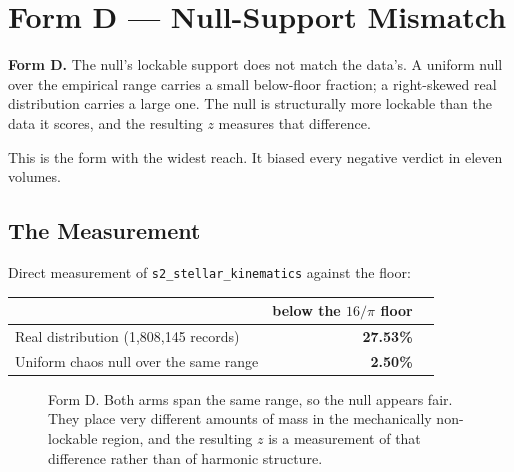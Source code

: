 \documentclass[11pt, letterpaper, openany]{book}
\begin{document}
\section{Form D --- Null-Support Mismatch}

\begin{formbox}
\textbf{Form D.} The null's lockable support does not match the data's. A uniform null over the
empirical range carries a small below-floor fraction; a right-skewed real distribution carries a
large one. The null is structurally more lockable than the data it scores, and the resulting $z$
measures that difference.
\end{formbox}

This is the form with the widest reach. It biased every negative verdict in eleven volumes.

\subsection{The Measurement}

Direct measurement of \texttt{s2\_stellar\_kinematics} against the floor:

\begin{table}[H]
\centering
\small
\begin{tabular}{@{}lrr@{}}
\toprule
& \textbf{below the $16/\pi$ floor} \\
\midrule
Real distribution (1{,}808{,}145 records) & \textbf{27.53\%} \\
Uniform chaos null over the same range & \textbf{2.50\%} \\
\bottomrule
\end{tabular}
\end{table}

\begin{figure}[H]
\centering
{}
\caption{Form D. Both arms span the same range, so the null appears fair. They place very
different amounts of mass in the mechanically non-lockable region, and the resulting $z$ is a
measurement of that difference rather than of harmonic structure.}
\end{figure}
\end{document}
